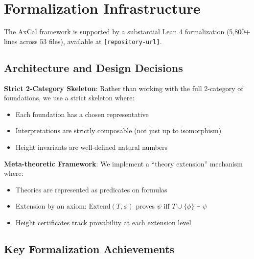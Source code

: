\documentclass[11pt]{article}
\begin{document}
\section{Formalization Infrastructure}

The AxCal framework is supported by a substantial Lean 4 formalization (5,800+ lines across 53 files), available at \texttt{[repository-url]}. 

\subsection{Architecture and Design Decisions}

\textbf{Strict 2-Category Skeleton}: Rather than working with the full 2-category of foundations, we use a strict skeleton where:
\begin{itemize}
\item Each foundation has a chosen representative
\item Interpretations are strictly composable (not just up to isomorphism)
\item Height invariants are well-defined natural numbers
\end{itemize}

\textbf{Meta-theoretic Framework}: We implement a ``theory extension'' mechanism where:
\begin{itemize}
\item Theories are represented as predicates on formulas
\item Extension by an axiom: $\text{Extend}(T, \phi)$ proves $\psi$ iff $T \cup \{\phi\} \vdash \psi$
\item Height certificates track provability at each extension level
\end{itemize}

\subsection{Key Formalization Achievements}
\end{document}
